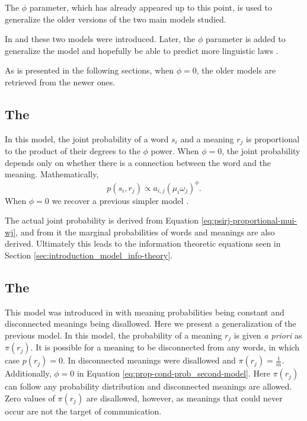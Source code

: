 
The $\phi$ parameter, which has already appeared up to this point, is used to generalize the older versions of the two main models studied.

In \cite{Ferrer2005a} and \cite{Ferrer2003a} these two models were introduced.
Later, the $\phi$ parameter is added to generalize the model and hopefully be able to predict more linguistic laws \cite{Ferrer2018a}.

As is presented in the following sections, when $\phi=0$, the older models are retrieved from the newer ones.

\subsection{The \firstmodel{}}
\label{sec:introduction_model_first-model}

In this model, the joint probability of a word $s_i$ and a meaning $r_j$ is proportional to the product of their degrees to the $\phi$ power.
When $\phi=0$, the joint probability depends only on whether there is a connection between the word and the meaning.
Mathematically,
\begin{equation*}
  \label{eq:psirj-proportional-mui-wj}
  p(s_i, r_j) \propto a_{i,j} (\mu_i \omega_j)^\phi.
\end{equation*}
When $\phi=0$ we recover a previous simpler model \cite{Ferrer2005a}.

The actual joint probability is derived from Equation \ref{eq:psirj-proportional-mui-wj}, and from it the marginal probabilities of words and meanings are also derived.
Ultimately this leads to the information theoretic equations seen in Section \ref{sec:introduction_model_info-theory}.

\subsection{The \secondmodel{}}
\label{sec:introduction_model_second-model}

This model was introduced in \cite{Ferrer2003a} with meaning probabilities being constant and disconnected meanings being disallowed.
Here we present a generalization of the previous model.
In this model, the probability of a meaning $r_j$ is given \emph{a priori} as $\pi(r_j)$.
It is possible for a meaning to be disconnected from any words, in which case $p(r_j) = 0$.
In \cite{Ferrer2003a} disconnected meanings were disallowed and $\pi(r_j) = \frac{1}{m}$.
Additionally, $\phi=0$ in Equation \ref{eq:prop-cond-prob_second-model}.
Here $\pi(r_j)$ can follow any probability distribution and disconnected meanings are allowed.
Zero values of $\pi(r_j)$ are disallowed, however, as meanings that could never occur are not the target of communication.

